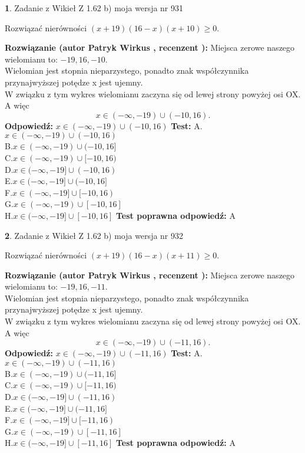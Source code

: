 \documentclass[12pt, a4paper]{article}
\theoremstyle{definition} %
\newtheorem{zad}{}
\newcommand{\zadStart}[1]{\begin{zad}#1\newline}
\newcommand{\zadStop}{\end{zad}}
\newcommand{\rozwStart}[2]{\noindent \textbf{Rozwiązanie (autor #1 , recenzent #2): }\newline}
\newcommand{\rozwStop}{\newline}
\newcommand{\odpStart}{\noindent \textbf{Odpowiedź:}\newline}
\newcommand{\odpStop}{\newline}
\newcommand{\testStart}{\noindent \textbf{Test:}\newline}
\newcommand{\testStop}{\newline}
\newcommand{\kluczStart}{\noindent \textbf{Test poprawna odpowiedź:}\newline}
\newcommand{\kluczStop}{\newline}
\begin{document}
\zadStart{Zadanie z Wikieł Z 1.62 b) moja wersja nr 931}

Rozwiązać nierówności $(x+19)(16-x)(x+10)\ge0$.
\zadStop
\rozwStart{Patryk Wirkus}{}
Miejsca zerowe naszego wielomianu to: $-19, 16, -10$.\\
Wielomian jest stopnia nieparzystego, ponadto znak współczynnika przy\linebreak najwyższej potędze x jest ujemny.\\ W związku z tym wykres wielomianu zaczyna się od lewej strony powyżej osi OX. A więc $$x \in (-\infty,-19) \cup (-10,16).$$
\rozwStop
\odpStart
$x \in (-\infty,-19) \cup (-10,16)$
\odpStop
\testStart
A.$x \in (-\infty,-19) \cup (-10,16)$\\
B.$x \in (-\infty,-19) \cup (-10,16]$\\
C.$x \in (-\infty,-19) \cup [-10,16)$\\
D.$x \in (-\infty,-19] \cup (-10,16)$\\
E.$x \in (-\infty,-19] \cup (-10,16]$\\
F.$x \in (-\infty,-19] \cup [-10,16)$\\
G.$x \in (-\infty,-19) \cup [-10,16]$\\
H.$x \in (-\infty,-19] \cup [-10,16]$
\testStop
\kluczStart
A
\kluczStop



\zadStart{Zadanie z Wikieł Z 1.62 b) moja wersja nr 932}

Rozwiązać nierówności $(x+19)(16-x)(x+11)\ge0$.
\zadStop
\rozwStart{Patryk Wirkus}{}
Miejsca zerowe naszego wielomianu to: $-19, 16, -11$.\\
Wielomian jest stopnia nieparzystego, ponadto znak współczynnika przy\linebreak najwyższej potędze x jest ujemny.\\ W związku z tym wykres wielomianu zaczyna się od lewej strony powyżej osi OX. A więc $$x \in (-\infty,-19) \cup (-11,16).$$
\rozwStop
\odpStart
$x \in (-\infty,-19) \cup (-11,16)$
\odpStop
\testStart
A.$x \in (-\infty,-19) \cup (-11,16)$\\
B.$x \in (-\infty,-19) \cup (-11,16]$\\
C.$x \in (-\infty,-19) \cup [-11,16)$\\
D.$x \in (-\infty,-19] \cup (-11,16)$\\
E.$x \in (-\infty,-19] \cup (-11,16]$\\
F.$x \in (-\infty,-19] \cup [-11,16)$\\
G.$x \in (-\infty,-19) \cup [-11,16]$\\
H.$x \in (-\infty,-19] \cup [-11,16]$
\testStop
\kluczStart
A
\kluczStop
\end{document}
